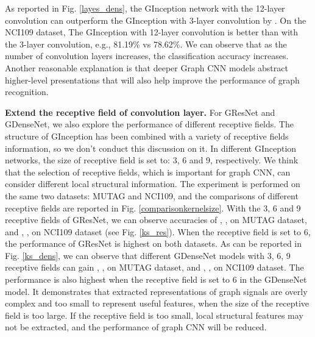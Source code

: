 \documentclass[journal]{IEEEtran}
\begin{document}
As reported in Fig. \ref{layes_dens}, the G\underline{\hspace{0.5em}}Inception network with the 12-layer convolution can outperform the G\underline{\hspace{0.5em}}Inception with 3-layer convolution by .
On the NCI109 dataset, The G\underline{\hspace{0.5em}}Inception with 12-layer convolution is better than with the 3-layer convolution, e.g., 81.19\% vs 78.62\%.
We can observe that as the number of convolution layers increases, the classification accuracy increases. Another reasonable explanation is that deeper Graph CNN models abstract higher-level presentations that will also help improve the performance of graph recognition.

\textbf{Extend the receptive field of convolution layer.} For G\underline{\hspace{0.5em}}ResNet and G\underline{\hspace{0.5em}}DenseNet, we also explore the performance of different receptive fields.
The structure of G\underline{\hspace{0.5em}}Inception has been combined with a variety of receptive fields information, so we don't conduct this discussion on it.
In different G\underline{\hspace{0.5em}}Inception networks, the size of receptive field is set to: 3, 6  and 9, respectively.
We think that the selection of receptive fields, which is important for graph CNN, can consider different local structural information.
The experiment is performed on the same two datasets: MUTAG and NCI109, and the comparisons of different receptive fields are reported in Fig. \ref{comparisonkernelsize}.
With the 3, 6 and 9 receptive fields of G\underline{\hspace{0.5em}}ResNet, we can observe accuracies of , ,  on MUTAG dataset, and , ,  on NCI109 dataset (see Fig. \ref{ks_res}).
When the receptive field is set to 6, the performance of G\underline{\hspace{0.5em}}ResNet is  highest on both datasets.
As can be reported in Fig. \ref{ks_dens}, we can observe that different G\underline{\hspace{0.5em}}DenseNet models with 3, 6, 9 receptive fields can gain
, ,  on MUTAG dataset, and , ,  on NCI109 dataset.
The performance is also highest when the receptive field is set to 6 in the G\underline{\hspace{0.5em}}DenseNet model.
It demonstrates that extracted representations of graph signals are overly complex and too small to represent useful features, when the size of the receptive field is too large.
If the receptive field is too small, local structural features may not be extracted, and the performance of graph CNN will be reduced.
\end{document}
